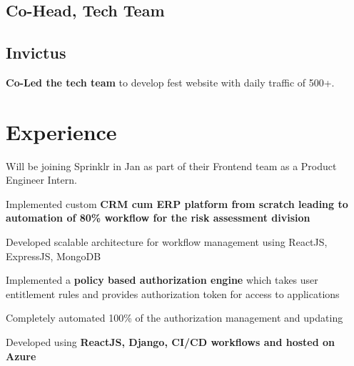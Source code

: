 \documentclass[]{ishaan-kamra-resume}
\begin{document}
\begin{minipage}[t]{0.33\textwidth}
\subsection{Co-Head, Tech Team}
\subsection{Invictus}
\textbullet{} \textbf{Co-Led the tech team} to develop fest website with daily traffic of 500+.
\sectionsep

%
%

\end{minipage} 
\hfill
\begin{minipage}[t]{0.66\textwidth} 


\section{Experience}
\vspace{\topsep} %
\begin{tightemize}
\item Will be joining Sprinklr in Jan as part of their Frontend team as a Product Engineer Intern.
\end{tightemize}
\sectionsep

\begin{tightemize}
\item Implemented custom \textbf{CRM cum ERP platform from scratch leading to automation of 80\% workflow for the risk assessment division}
\item Developed scalable architecture for workflow management using ReactJS, ExpressJS, MongoDB
\end{tightemize}
\sectionsep

\begin{tightemize}
\item Implemented a \textbf{policy based authorization engine} which takes user entitlement rules and provides authorization token for access to applications
\item Completely automated 100\% of the authorization management and updating
\item Developed using \textbf{ReactJS, Django, CI/CD workflows and hosted on Azure}
\end{tightemize}
\sectionsep


\end{minipage}
\end{document}
